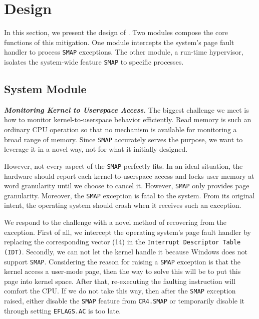 
\section{\name Design}
\label{sec:design}

In this section, we present the design of \name. Two modules compose the core functions of this mitigation. One module intercepts the system's page fault handler to process \texttt{SMAP} exceptions. The other module, a run-time hypervisor, isolates the system-wide feature \texttt{SMAP} to specific processes.

\subsection{System Module}

\textbf{\textit{Monitoring Kernel to Userspace Access.}} The biggest challenge we meet is how to monitor kernel-to-userspace behavior efficiently. Read memory is such an ordinary CPU operation so that no mechanism is available for monitoring a broad range of memory. Since \texttt{SMAP} accurately serves the purpose, we want to leverage it in a novel way, not for what it initially designed.

However, not every aspect of the \texttt{SMAP} perfectly fits. In an ideal situation, the hardware should report each kernel-to-userspace access and locks user memory at word granularity until we choose to cancel it.  However, \texttt{SMAP} only provides page granularity. Moreover, the \texttt{SMAP} exception is fatal to the system. From its original intent, the operating system should crash when it receives such an exception.



We respond to the challenge with a novel method of recovering from the exception. First of all, we intercept the operating system's page fault handler by replacing the corresponding vector (14) in the \texttt{Interrupt Descriptor Table (IDT)}. Secondly, we can not let the kernel handle it because Windows does not support \texttt{SMAP}. Considering the reason for raising a \texttt{SMAP} exception is that the kernel access a user-mode page, then the way to solve this will be to put this page into kernel space. After that, re-executing the faulting instruction will comfort the CPU. If we do not take this way, then after the \texttt{SMAP} exception raised, either disable the \texttt{SMAP} feature from \texttt{CR4.SMAP} or temporarily disable it through setting \texttt{EFLAGS.AC} is too late. 

